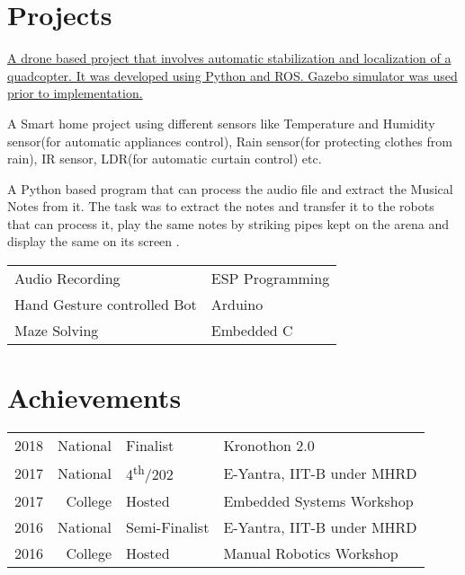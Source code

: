 \documentclass[]{deedy-resume-openfont}
\begin{document}
\begin{minipage}[t]{0.66\textwidth}

\section{Projects}

\href{https://github.com/sakshamkatiyar/chaser_drone}{
A drone based project that involves automatic stabilization and localization of a quadcopter. It was developed using Python and ROS. Gazebo simulator was used prior to implementation.
\sectionsep}

A Smart home project using different sensors like Temperature and Humidity sensor(for automatic appliances control), Rain sensor(for protecting clothes from rain), IR sensor, LDR(for automatic curtain control) etc.
\sectionsep

A Python based program that can process the audio file and extract the Musical Notes from it. The task was to extract the notes and transfer it to the robots that can process it, play the same notes by striking pipes kept on the arena and display the same on its screen .
\sectionsep

\begin{tabular}{ll}
    \textbullet{} Audio Recording & ESP Programming \\
    \textbullet{} Hand Gesture controlled Bot & Arduino \\
    \textbullet{} Maze Solving & Embedded C
\end{tabular}
\sectionsep


\section{Achievements} 
\begin{tabular}{rrll}
2018 & National & Finalist & Kronothon 2.0 \\
2017 & National & 4\textsuperscript{th}/202  & E-Yantra, IIT-B under MHRD \\
2017 & College & Hosted & Embedded Systems Workshop \\
2016 & National & Semi-Finalist & E-Yantra, IIT-B under MHRD \\
2016 & College & Hosted & Manual Robotics Workshop \\
\end{tabular}
\sectionsep


\end{minipage} 
\end{document}
